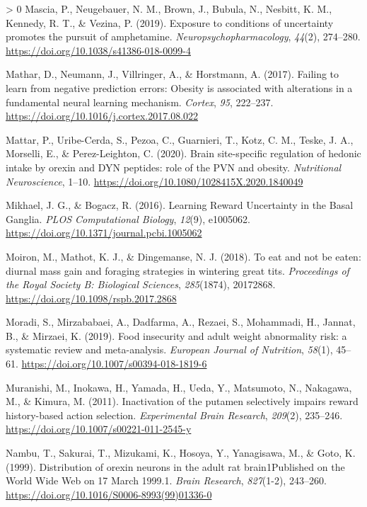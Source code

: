 \documentclass[
]{/home/nicoluarte/Downloads/templates/PNAS-template-main.tex}
\newlength{\cslhangindent}
\newenvironment{CSLReferences}[3] %
 {%
  \setlength{\parindent}{0pt}
  \ifodd #1 \everypar{\setlength{\hangindent}{\cslhangindent}}\ignorespaces\fi
  \ifnum #2 > 0
  \setlength{\parskip}{#2\baselineskip}
  \fi
 }%
 {}
\begin{document}
\begin{CSLReferences}{1}{0}
\leavevmode\hypertarget{ref-ELZ2PYYM}{}%
Mascia, P., Neugebauer, N. M., Brown, J., Bubula, N., Nesbitt, K. M.,
Kennedy, R. T., \& Vezina, P. (2019). Exposure to conditions of
uncertainty promotes the pursuit of amphetamine.
\emph{Neuropsychopharmacology}, \emph{44}(2), 274--280.
\url{https://doi.org/10.1038/s41386-018-0099-4}

\leavevmode\hypertarget{ref-DBGUDZRL}{}%
Mathar, D., Neumann, J., Villringer, A., \& Horstmann, A. (2017).
Failing to learn from negative prediction errors: Obesity is associated
with alterations in a fundamental neural learning mechanism.
\emph{Cortex}, \emph{95}, 222--237.
\url{https://doi.org/10.1016/j.cortex.2017.08.022}

\leavevmode\hypertarget{ref-Q8IHJK68}{}%
Mattar, P., Uribe-Cerda, S., Pezoa, C., Guarnieri, T., Kotz, C. M.,
Teske, J. A., Morselli, E., \& Perez-Leighton, C. (2020). Brain
site-specific regulation of hedonic intake by orexin and DYN peptides:
role of the PVN and obesity. \emph{Nutritional Neuroscience}, 1--10.
\url{https://doi.org/10.1080/1028415X.2020.1840049}

\leavevmode\hypertarget{ref-BUXRNM89}{}%
Mikhael, J. G., \& Bogacz, R. (2016). Learning Reward Uncertainty in the
Basal Ganglia. \emph{PLOS Computational Biology}, \emph{12}(9),
e1005062. \url{https://doi.org/10.1371/journal.pcbi.1005062}

\leavevmode\hypertarget{ref-BW3RY7GD}{}%
Moiron, M., Mathot, K. J., \& Dingemanse, N. J. (2018). To eat and not
be eaten: diurnal mass gain and foraging strategies in wintering great
tits. \emph{Proceedings of the Royal Society B: Biological Sciences},
\emph{285}(1874), 20172868. \url{https://doi.org/10.1098/rspb.2017.2868}

\leavevmode\hypertarget{ref-4LJKTR3N}{}%
Moradi, S., Mirzababaei, A., Dadfarma, A., Rezaei, S., Mohammadi, H.,
Jannat, B., \& Mirzaei, K. (2019). Food insecurity and adult weight
abnormality risk: a systematic review and meta-analysis. \emph{European
Journal of Nutrition}, \emph{58}(1), 45--61.
\url{https://doi.org/10.1007/s00394-018-1819-6}

\leavevmode\hypertarget{ref-XZBUNRIS}{}%
Muranishi, M., Inokawa, H., Yamada, H., Ueda, Y., Matsumoto, N.,
Nakagawa, M., \& Kimura, M. (2011). Inactivation of the putamen
selectively impairs reward history-based action selection.
\emph{Experimental Brain Research}, \emph{209}(2), 235--246.
\url{https://doi.org/10.1007/s00221-011-2545-y}

\leavevmode\hypertarget{ref-C4QSBWHV}{}%
Nambu, T., Sakurai, T., Mizukami, K., Hosoya, Y., Yanagisawa, M., \&
Goto, K. (1999). Distribution of orexin neurons in the adult rat
brain1Published on the World Wide Web on 17 March 1999.1. \emph{Brain
Research}, \emph{827}(1-2), 243--260.
\url{https://doi.org/10.1016/S0006-8993(99)01336-0}


\end{CSLReferences}
\end{document}
